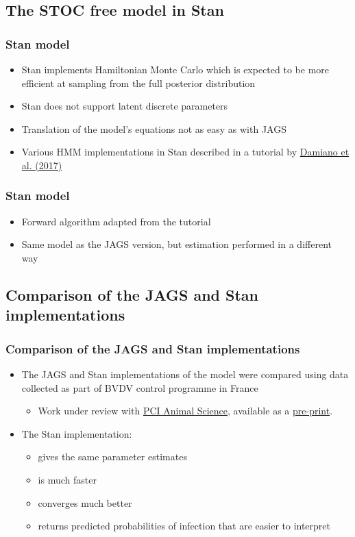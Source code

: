 \documentclass{beamer}
\begin{document}
\subsection[Stan]{The STOC free model in Stan}

\begin{frame}[fragile]
\frametitle{Stan model}
\begin{itemize}
 \item{Stan implements Hamiltonian Monte Carlo which is expected to be more efficient at sampling from the full posterior distribution}
 \item{Stan does not support latent discrete parameters}
 \item{Translation of the model’s equations not as easy as with JAGS}
 \item{Various HMM implementations in Stan described in a tutorial by \href{https://github.com/luisdamiano/stancon18}{Damiano et al. (2017)}}
\end{itemize}
\end{frame}

\begin{frame}
\frametitle{Stan model}
\begin{itemize}
 \item{Forward algorithm adapted from the tutorial}
 \item{Same model as the JAGS version, but estimation performed in a different way}
\end{itemize}
\end{frame}

\subsection[JAGS vs. Stan]{Comparison of the JAGS and Stan implementations}

\begin{frame}
\frametitle{Comparison of the JAGS and Stan implementations}
\begin{itemize}
 \item{The JAGS and Stan implementations of the model were compared using data collected as part of BVDV control programme in France}
 \begin{itemize}
  \item{Work under review with \href{https://animsci.peercommunityin.org/}{PCI Animal Science}, available as a \href{https://www.biorxiv.org/content/10.1101/2020.07.10.197426v4.full}{pre-print}.}
 \end{itemize}
 \item{The Stan implementation:}
 \begin{itemize}
  \item{gives the same parameter estimates}
  \item{is much faster}
  \item{converges much better}
  \item{returns predicted probabilities of infection that are easier to interpret}
 \end{itemize}
\end{itemize}
\end{frame}
\end{document}
